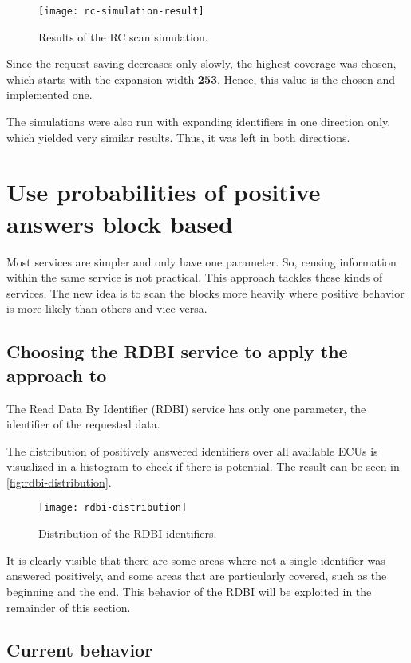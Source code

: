 \begin{figure}[htb]
    \centering
    \texttt{[image: rc-simulation-result]}
    \caption{Results of the RC scan simulation.}
    \label{fig:rc-simulation-result}
\end{figure}

Since the request saving decreases only slowly, the highest coverage was chosen, which starts with the expansion width \textbf{253}. Hence, this value is the chosen and implemented one.

The simulations were also run with expanding identifiers in one direction only, which yielded very similar results. Thus, it was left in both directions.


\section{Use probabilities of positive answers block based}

Most services are simpler and only have one parameter. So, reusing information within the same service is not practical. This approach tackles these kinds of services. The new idea is to scan the blocks more heavily where positive behavior is more likely than others and vice versa.

\subsection{Choosing the RDBI service to apply the approach to}

The Read Data By Identifier (RDBI) service has only one parameter, the identifier of the requested data.

The distribution of positively answered identifiers over all available ECUs is visualized in a histogram to check if there is potential. The result can be seen in \autoref{fig:rdbi-distribution}.

\begin{figure}[htb]
    \centering
    \texttt{[image: rdbi-distribution]}
    \caption{Distribution of the RDBI identifiers.}
    \label{fig:rdbi-distribution}
\end{figure}

It is clearly visible that there are some areas where not a single identifier was answered positively, and some areas that are particularly covered, such as the beginning and the end. This behavior of the RDBI will be exploited in the remainder of this section.

\subsection{Current behavior}

